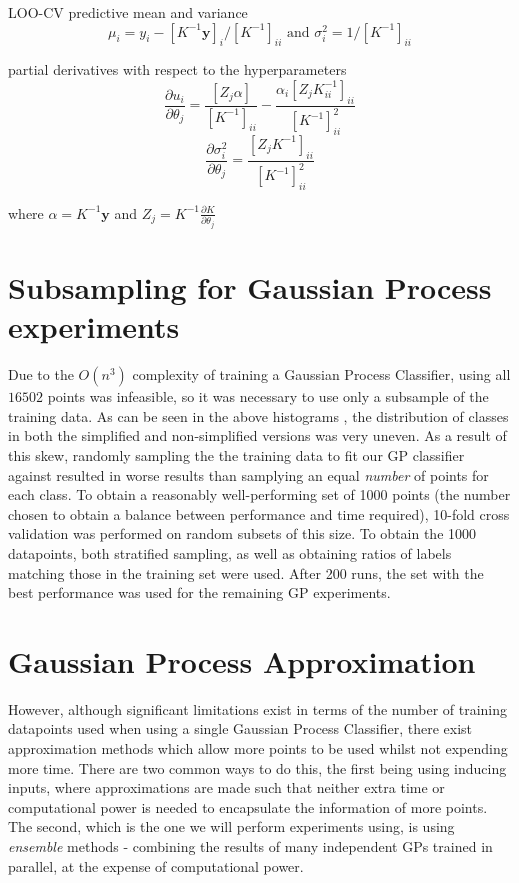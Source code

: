 LOO-CV predictive mean and variance
$$\mu_i= y_i - [K^{-1}\mathbf{y}]_i / [K^{-1}]_{ii} \text{ and } \sigma_i^2 = 1/[K^{-1}]_{ii}$$

partial derivatives with respect to the hyperparameters
$$\frac{\partial{u_i}}{\partial{\theta_j}} = \frac{[Z_j \alpha]}{[K^{-1}]_{ii}} - \frac{\alpha_i[Z_j K^{-1}_{ii}]_{ii}}{[K^{-1}]^2_{ii}}$$
$$\frac{\partial{\sigma_i^2}}{\partial{\theta_j}} = \frac{[Z_jK^{-1}]_{ii}}{[K^{-1}]^2_{ii}}$$

where $\alpha = K^{-1}\mathbf{y}$ and $Z_j = K^{-1} \frac{\partial{K}}{\partial{\theta_j}}$

\section{Subsampling for Gaussian Process experiments}

Due to the $O(n^3)$ complexity of training a Gaussian Process Classifier, using all $16502$ points was infeasible, so it was necessary to use only a subsample of the training data. As can be seen in the above histograms , the distribution of classes in both the simplified and non-simplified versions was very uneven. As a result of this skew, randomly sampling the the training data to fit our GP classifier against resulted in worse results than samplying an equal \textit{number} of points for each class. To obtain a reasonably well-performing set of 1000 points (the number chosen to obtain a balance between performance and time required), 10-fold cross validation was performed on random subsets of this size. To obtain the 1000 datapoints, both stratified sampling, as well as obtaining ratios of labels matching those in the training set were used. After 200 runs, the set with the best performance was used for the remaining GP experiments.

\section{Gaussian Process Approximation}

However, although significant limitations exist in terms of the number of training datapoints used when using a single Gaussian Process Classifier, there exist approximation methods which allow more points to be used whilst not expending more time. There are two common ways to do this, the first being using inducing inputs, where approximations are made such that neither extra time or computational power is needed to encapsulate the information of more points. The second, which is the one we will perform experiments using, is using \textit{ensemble} methods - combining the results of many independent GPs trained in parallel, at the expense of computational power.

\citep{deisenroth15}

